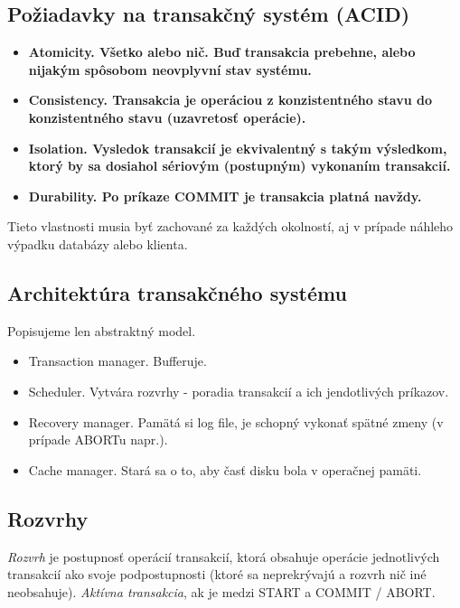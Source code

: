 \documentclass[10pt,a4paper]{article}
\begin{document}
\subsection{Požiadavky na transakčný systém (ACID)}

\begin{itemize}
\item \bf{A}tomicity. Všetko alebo nič. Buď transakcia prebehne, alebo nijakým spôsobom neovplyvní stav systému. 
\item \bf{C}onsistency. Transakcia je operáciou z konzistentného stavu do konzistentného stavu (uzavretosť operácie). 
\item \bf{I}solation. Vysledok transakcií je ekvivalentný s takým výsledkom, ktorý by sa dosiahol sériovým (postupným) vykonaním transakcií. 
\item \bf{D}urability. Po príkaze COMMIT je transakcia platná navždy. 
\end{itemize}

Tieto vlastnosti musia byť zachované za každých okolností, aj v prípade náhleho výpadku databázy alebo klienta. 

\subsection{Architektúra transakčného systému}

Popisujeme len abstraktný model. 

\begin{itemize}
\item Transaction manager. Bufferuje. 
\item Scheduler. Vytvára rozvrhy - poradia transakcií a ich jendotlivých príkazov. 
\item Recovery manager. Pamätá si log file, je schopný vykonať spätné zmeny (v prípade ABORTu napr.).
\item Cache manager. Stará sa o to, aby časť disku bola v operačnej pamäti.  
\end{itemize}

\subsection{Rozvrhy}

\emph{Rozvrh} je postupnosť operácií transakcií, ktorá obsahuje operácie jednotlivých transakcií ako svoje podpostupnosti (ktoré sa neprekrývajú a rozvrh nič iné neobsahuje). 
\emph{Aktívna transakcia}, ak je medzi START a COMMIT / ABORT. 
\end{document}
